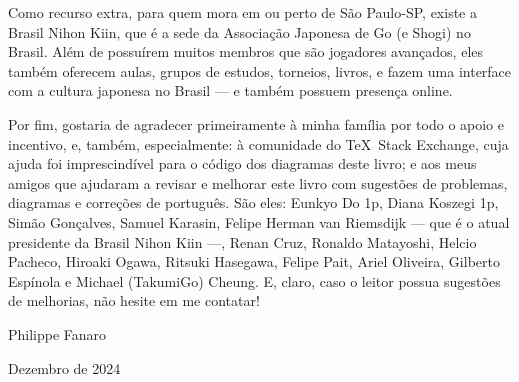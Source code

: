 Como recurso extra, para quem mora em ou perto de São Paulo-SP, existe a Brasil Nihon Kiin, que é a sede da Associação Japonesa de Go (e Shogi) no Brasil. Além de possuírem muitos membros que são jogadores avançados, eles também oferecem aulas, grupos de estudos, torneios, livros, e fazem uma interface com a cultura japonesa no Brasil --- e também possuem presença online.

Por fim, gostaria de agradecer primeiramente à minha família por todo o apoio e incentivo, e, também, especialmente: à comunidade do \TeX \ Stack Exchange, cuja ajuda foi imprescindível para o código dos diagramas deste livro; e aos meus amigos que ajudaram a revisar e melhorar este livro com sugestões de problemas, diagramas e correções de português. São eles: Eunkyo Do 1p, Diana Koszegi 1p, Simão Gonçalves, Samuel Karasin, Felipe Herman van Riemsdijk --- que é o atual presidente da Brasil Nihon Kiin ---, Renan Cruz, Ronaldo Matayoshi, Helcio Pacheco, Hiroaki Ogawa, Ritsuki Hasegawa, Felipe Pait, Ariel Oliveira, Gilberto Espínola e Michael (TakumiGo) Cheung. E, claro, caso o leitor possua sugestões de melhorias, não hesite em me contatar!

\bigskip
\smallskip
\smallskip
\smallskip

\hspace*{\fill} Philippe Fanaro \hspace{0.02cm}

\hspace*{\fill} Dezembro de 2024